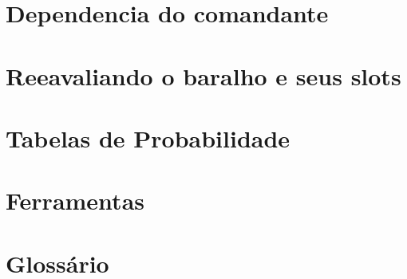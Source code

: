 \documentclass[12pt, a4paper]{article}
\begin{document}
    \section{Dependencia do comandante}
     \pagebreak

    \section{Reeavaliando o baralho e seus slots}
     \pagebreak

    \section{Tabelas de Probabilidade}
     \pagebreak

    \section{Ferramentas}
     \pagebreak

    \section{Glossário}
     \pagebreak

    
\end{document}
